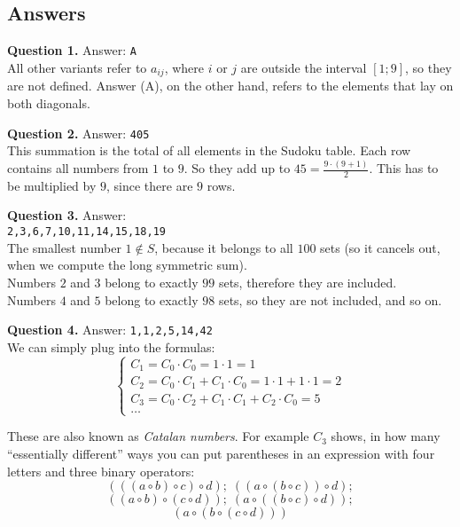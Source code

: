 \documentclass[jou]{apa6}
\begin{document}
\newpage

\subsection{Answers}


\vspace{6pt}
{\bf Question 1.} Answer: {\tt A}\\
All other variants refer to $a_{ij}$, where $i$ or $j$ are outside the interval $[1;9]$, 
so they are not defined. Answer (A), on the other hand, refers to the elements that
lay on both diagonals.

\vspace{6pt}
{\bf Question 2.} Answer: {\tt 405}\\
This summation is the total of all elements in the Sudoku table. 
Each row contains all numbers from $1$ to $9$. So they add up to 
$45 = \frac{9 \cdot (9+1)}{2}$. This has to be multiplied by $9$, since
there are $9$ rows. 

\vspace{6pt}
{\bf Question 3.} Answer:\\ {\tt 2,3,6,7,10,11,14,15,18,19}\\
The smallest number $1 \not\in S$, because it belongs to all $100$ sets (so it cancels out, when 
we compute the long symmetric sum).\\
Numbers $2$ and $3$ belong to exactly $99$ sets, therefore they are included.\\
Numbers $4$ and $5$ belong to exactly $98$ sets, so they are not included, and so on. 



\vspace{6pt}
{\bf Question 4.} Answer: {\tt 1,1,2,5,14,42}\\
We can simply plug into the formulas: 
$$\left\{ \begin{array}{l}
C_1 = C_0 \cdot C_0 = 1 \cdot 1 = 1\\
C_2 = C_0 \cdot C_1 + C_1 \cdot C_0 = 1 \cdot 1 + 1 \cdot 1 = 2\\
C_3 = C_0 \cdot C_2 + C_1 \cdot C_1 + C_2 \cdot C_0 = 5\\
\ldots
\end{array} \right.$$

These are also known as {\em Catalan numbers}. 
For example $C_3$ shows, in how many ``essentially different'' ways you can put parentheses
in an expression with four letters and three binary operators:
$$(((a \circ b) \circ c) \circ d);\; ((a \circ (b \circ c)) \circ d);$$
$$((a \circ b) \circ (c \circ d));\; (a \circ ((b \circ c) \circ d));$$ 
$$(a \circ (b \circ (c \circ d)))$$
\end{document}
